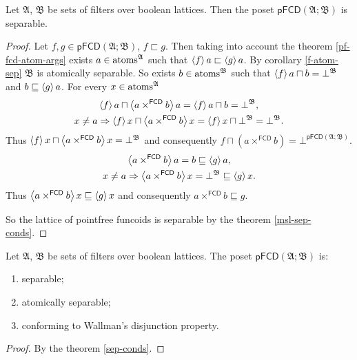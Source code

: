 \begin{thm}
\label{pf-fcd-sep}Let $\mathfrak{A}$, $\mathfrak{B}$ be sets of
filters over boolean lattices. Then the poset $\mathsf{pFCD}(\mathfrak{A};\mathfrak{B})$
is separable.\end{thm}
\begin{proof}
Let $f,g\in\mathsf{pFCD}(\mathfrak{A};\mathfrak{B})$, $f\sqsubset g$.
Then taking into account the theorem \ref{pf-fcd-atom-args} exists
$a\in\operatorname{atoms}^{\mathfrak{A}}$ such that $\left\langle f\right\rangle a\sqsubset\left\langle g\right\rangle a$.
By corollary \ref{f-atom-sep} $\mathfrak{B}$ is atomically separable.
So exists $b\in\operatorname{atoms}^{\mathfrak{B}}$ such that $\left\langle f\right\rangle a\sqcap b=\bot^{\mathfrak{B}}$
and $b\sqsubseteq\left\langle g\right\rangle a$. For every $x\in\operatorname{atoms}^{\mathfrak{A}}$
\begin{gather*}
\left\langle f\right\rangle a\sqcap\left\langle a\times^{\mathsf{FCD}}b\right\rangle a=\left\langle f\right\rangle a\sqcap b=\bot^{\mathfrak{B}},\\
x\ne a\Rightarrow\left\langle f\right\rangle x\sqcap\left\langle a\times^{\mathsf{FCD}}b\right\rangle x=\left\langle f\right\rangle x\sqcap\bot^{\mathfrak{B}}=\bot^{\mathfrak{B}}.
\end{gather*}
Thus $\left\langle f\right\rangle x\sqcap\left\langle a\times^{\mathsf{FCD}}b\right\rangle x=\bot^{\mathfrak{B}}$
and consequently $f\sqcap(a\times^{\mathsf{FCD}}b)=\bot^{\mathsf{pFCD}(\mathfrak{A};\mathfrak{B})}$.
\begin{gather*}
\left\langle a\times^{\mathsf{FCD}}b\right\rangle a=b\sqsubseteq\left\langle g\right\rangle a,\\
x\ne a\Rightarrow\left\langle a\times^{\mathsf{FCD}}b\right\rangle x=\bot^{\mathfrak{B}}\sqsubseteq\left\langle g\right\rangle x.
\end{gather*}
Thus $\left\langle a\times^{\mathsf{FCD}}b\right\rangle x\sqsubseteq\left\langle g\right\rangle x$ and
consequently $a\times^{\mathsf{FCD}}b\sqsubseteq g$.

So the lattice of pointfree funcoids is separable by the theorem \ref{msl-sep-conds}.\end{proof}
\begin{cor}
\label{pf-fcd-is-sep}Let $\mathfrak{A}$, $\mathfrak{B}$ be sets
of filters over boolean lattices. The poset $\mathsf{pFCD}(\mathfrak{A};\mathfrak{B})$
is:
\begin{enumerate}
\item separable;
\item atomically separable;
\item conforming to Wallman's disjunction property.
\end{enumerate}
\end{cor}
\begin{proof}
By the theorem \ref{sep-conds}.\end{proof}
